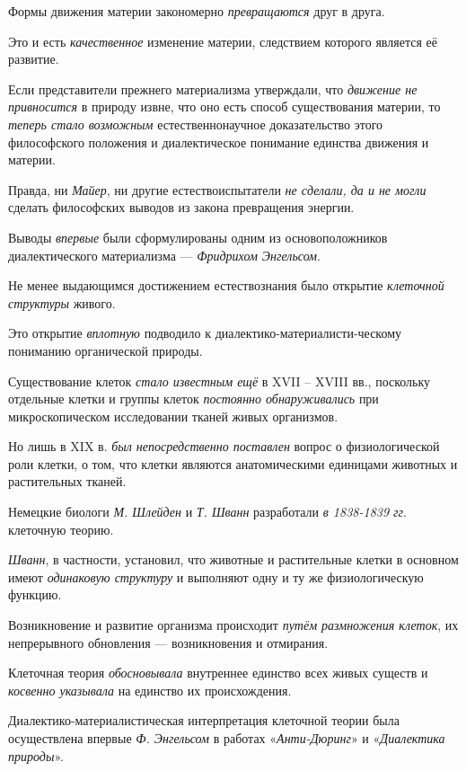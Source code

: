 \documentclass[a4paper,14pt,russian]{extreport}
\begin{document}
Формы движения материи закономерно \emph{превращаются} друг в друга.

Это и есть \emph{качественное} изменение материи, следствием которого является её развитие.

Если представители прежнего материализма утверждали, что \emph{движение не привносится} в природу извне, что оно есть способ существования материи, то \emph{теперь стало возможным} естественнонаучное доказательство этого философского положения и диалектическое понимание единства движения и материи.

Правда, ни \emph{Майер}, ни другие естествоиспытатели \emph{не сделали, да и не могли} сделать философских выводов из закона превращения энергии.

Выводы \emph{впервые} были сформулированы одним из основоположников диалектического материализма --- \emph{Фридрихом Энгельсом}.

Не менее выдающимся достижением естествознания было открытие \emph{клеточной структуры} живого.

Это открытие \emph{вплотную} подводило к диалектико-материалисти-ческому пониманию органической природы.

Существование клеток \emph{стало известным ещё} в XVII -- XVIII вв., поскольку отдельные клетки и группы клеток \emph{постоянно обнаруживались} при микроскопическом исследовании тканей живых организмов.

Но лишь в XIX в. \emph{был непосредственно поставлен} вопрос о физиологической роли клетки, о том, что клетки являются анатомическими единицами животных и растительных тканей.

Немецкие биологи \emph{М. Шлейден} и \emph{Т. Шванн} разработали \emph{в 1838-1839 гг}. клеточную теорию.

\emph{Шванн}, в частности, установил, что животные и растительные клетки в основном имеют \emph{одинаковую структуру} и выполняют одну и ту же физиологическую функцию.

Возникновение и развитие организма происходит \emph{путём размножения клеток}, их непрерывного обновления --- возникновения и отмирания.

Клеточная теория \emph{обосновывала} внутреннее единство всех живых существ и \emph{косвенно указывала} на единство их происхождения.

Диалектико-материалистическая интерпретация клеточной теории была осуществлена впервые \emph{Ф. Энгельсом} в работах «\emph{Анти-Дюринг}» и «\emph{Диалектика природы}».
\end{document}
